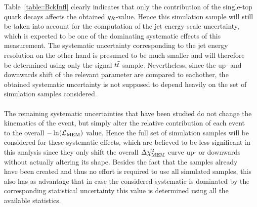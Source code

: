 Table~\ref{table::BckInfl} clearly indicates that only the contribution of the single-top quark decays affects the obtained $g_{R}$-value.
Hence this simulation sample will still be taken into account for the computation of the jet energy scale uncertainty, which is expected to be one of the dominating systematic effects of this measurement.
The systematic uncertainty corresponding to the jet energy resolution on the other hand is presumed to be much smaller and will therefore be determined using only the signal $t\bar{t}$ sample.
Nevertheless, since the up- and downwards shift of the relevant parameter are compared to eachother, the obtained systematic uncertainty is not supposed to depend heavily on the set of simulation samples considered.
\\
\\
The remaining systematic uncertainties that have been studied do not change the kinematics of the event, but simply alter the relative contribution of each event to the overall $-\ln(\mathcal{L}_{\textrm{MEM}})$ value. 
Hence the full set of simulation samples will be considered for these systematic effects, which are believed to be less significant in this analysis since they only shift the overall $\Delta \chi^{2}_{\textrm{MEM}}$ curve up- or downwards without actually altering its shape.
Besides the fact that the samples already have been created and thus no effort is required to use all simulated samples, this also has as advantage that in case the considered systematic is dominated by the corresponding statistical uncertainty this value is determined using all the available statistics.
\\

